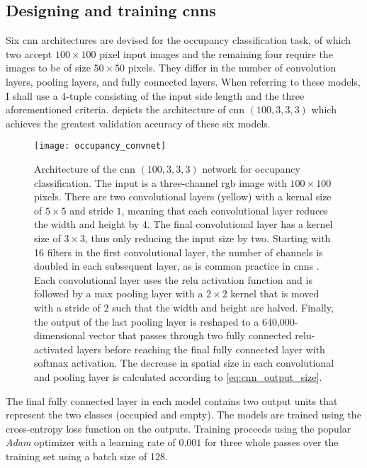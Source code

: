 \documentclass[../report.tex]{subfiles}
\begin{document}
\subsection{Designing and training \glspl{cnn}}
\label{sec:occupancy_cnns}
Six \gls{cnn} architectures are devised for the occupancy classification task, of which two accept $100\times 100$ pixel input images and the remaining four require the images to be of size $50\times 50$ pixels.
They differ in the number of convolution layers, pooling layers, and fully connected layers.
When referring to these models, I shall use a 4-tuple consisting of the input side length and the three aforementioned criteria.
 depicts the architecture of \acs{cnn} $(100, 3, 3, 3)$ which achieves the greatest validation accuracy of these six models.
\begin{figure}
    \centering
    \texttt{[image: occupancy\_convnet]}
    \caption[Architecture of the CNN $(100,3,3,3)$ network for occupancy classification.]{
        Architecture of the \gls{cnn} $(100,3,3,3)$ network for occupancy classification.
        The input is a three-channel \gls{rgb} image with $100\times 100$ pixels.
        There are two convolutional layers (yellow) with a kernal size of $5 \times 5$ and stride $1$, meaning that each convolutional layer reduces the width and height by $4$.
        The final convolutional layer has a kernel size of $3 \times 3$, thus only reducing the input size by two.
        Starting with 16 filters in the first convolutional layer, the number of channels is doubled in each subsequent layer, as is common practice in \glspl{cnn} \cite{simonyan2015}.
        Each convolutional layer uses the \gls{relu} activation function and is followed by a max pooling layer with a $2\times 2$ kernel that is moved with a stride of $2$ such that the width and height are halved.
        Finally, the output of the last pooling layer is reshaped to a 640,000-dimensional vector that passes through two fully connected \gls{relu}-activated layers before reaching the final fully connected layer with softmax activation.
        The decrease in spatial size in each convolutional and pooling layer is calculated according to \cref{eq:cnn_output_size}.
    }
    \label{fig:occupancy_convnet}
\end{figure}
The final fully connected layer in each model contains two output units that represent the two classes (occupied and empty).
The models are trained using the cross-entropy loss function on the outputs.
Training proceeds using the popular \emph{Adam} optimizer \cite{kingma2017} with a learning rate of $0.001$ for three whole passes over the training set using a batch size of 128.
\end{document}

